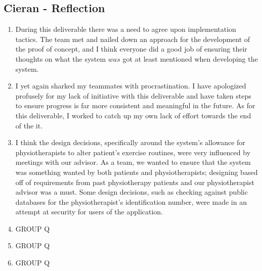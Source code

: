 \documentclass[12pt, titlepage]{article}
\begin{document}
\subsection*{Cieran - Reflection}
\begin{enumerate}
  \item During this deliverable there was a need to agree upon implementation tactics. The team met and nailed down an approach for the development of the proof of concept, and I think everyone did a good job of ensuring their thoughts on what the system $was$ got at least mentioned when developing the system.
  \item I yet again sharked my teammates with procrastination. I have apologized profusely for my lack of initiative with this deliverable and have taken steps to ensure progress is far more consistent and meaningful in the future. As for this deliverable, I worked to catch up my own lack of effort towards the end of the it.
  \item I think the design decisions, specifically around the system's allowance for physiotherapists to alter patient's exercise routines, were very influenced by meetings with our advisor. As a team, we wanted to ensure that the system was something wanted by both patients and physiotherapists; designing based off of requirements from past physiotherapy patients and our physiotherapist advisor was a must. Some design decisions, such as checking against public databases for the physiotherapist's identification number, were made in an attempt at security for users of the application.
  \item GROUP Q
  \item GROUP Q
  \item GROUP Q
\end{enumerate}
\end{document}
